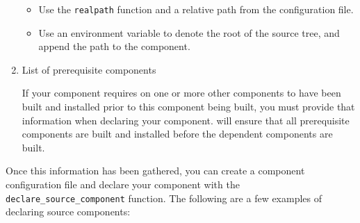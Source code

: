 \begin{enumerate}
  \begin{itemize}
    \item Use the \gnumake \texttt{realpath} function and a relative path from
      the configuration file.
    \item Use an environment variable to denote the root of the source
      tree, and append the path to the component.
  \end{itemize}

\item List of prerequisite components

  If your component requires on one or more other components to have
  been built and installed prior to this component being built, you
  must provide that information when declaring your component.  \lmsbw
  will ensure that all prerequisite components are built and installed
  before the dependent components are built.
\end{enumerate}

Once this information has been gathered, you can create a component
configuration file and declare your component with the
\texttt{declare\_source\_component} function.  The following are a few
examples of declaring source components:

